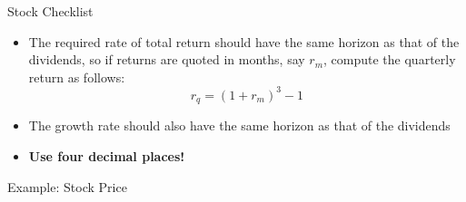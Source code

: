 \documentclass{beamer}
\newcommand{\should}{\overset{\text{should}}{=}}
\begin{document}
\begin{frame}{Stock Checklist}
	\begin{itemize}
		\item[$\checkmark$] The required rate of total return should have the same horizon as that of the dividends, so if returns are quoted in months, say $r_{m}$, compute the quarterly return as follows:
		\begin{equation}
			r_{q}=(1+r_{m})^{3}-1
		\end{equation}
		\item[$\checkmark$] The growth rate should also have the same horizon as that of the dividends 
		\item[$\checkmark$] \textbf{Use four decimal places!}
	\end{itemize}
\end{frame}

\begin{frame}{Example: Stock Price}
	
	\pause
	{\color{blue}}
\end{frame}

\end{document}
